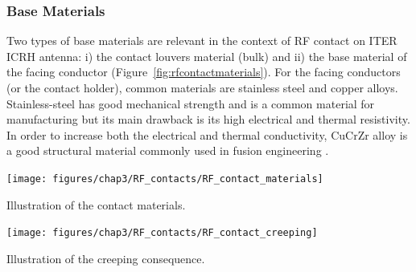 {\subsubsection{Base Materials}
Two types of base materials are relevant in the context of RF contact on ITER ICRH antenna: i) the contact louvers material (bulk) and ii) the base material of the facing conductor (Figure~\ref{fig:rfcontactmaterials}). For the facing conductors (or the contact holder), common materials are stainless steel and copper alloys. Stainless-steel has good mechanical strength and is a common material for manufacturing but its main drawback is its high electrical and thermal resistivity. In order to increase both the electrical and thermal conductivity, CuCrZr alloy is a good structural material commonly used in fusion engineering .

\begin{marginfigure}
	\centering
	\texttt{[image: figures/chap3/RF\_contacts/RF\_contact\_materials]}
	\caption{Illustration of the contact materials.}
	\label{fig:rfcontactmaterials}
\end{marginfigure} 

\begin{marginfigure}
	\centering
	\texttt{[image: figures/chap3/RF\_contacts/RF\_contact\_creeping]}
	\caption{Illustration of the creeping consequence.}
	\label{fig:rfcontactcreeping}
\end{marginfigure}

}
